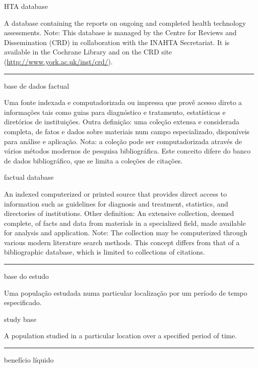 \documentclass[
]{book}
\begin{document}
HTA database

A database containing the reports on ongoing and completed health technology assessments. Note: This database is managed by the Centre for Reviews and Dissemination (CRD) in collaboration with the INAHTA Secretariat. It is available in the Cochrane Library and on the CRD site (\url{http://www.york.ac.uk/inst/crd/}).

\begin{center}\rule{0.5\linewidth}{0.5pt}\end{center}

base de dados factual

Uma fonte indexada e computadorizada ou impressa que provê acesso direto a informações tais como guias para diagnóstico e tratamento, estatísticas e diretórios de instituições. Outra definição: uma coleção extensa e considerada completa, de fatos e dados sobre materiais num campo especializado, disponíveis para análise e aplicação. Nota: a coleção pode ser computadorizada através de vários métodos modernos de pesquisa bibliográfica. Este conceito difere do banco de dados bibliográfico, que se limita a coleções de citações.

factual database

An indexed computerized or printed source that provides direct access to information such as guidelines for diagnosis and treatment, statistics, and directories of institutions. Other definition: An extensive collection, deemed complete, of facts and data from materials in a specialized field, made available for analysis and application. Note: The collection may be computerized through various modern literature search methods. This concept differs from that of a bibliographic database, which is limited to collections of citations.

\begin{center}\rule{0.5\linewidth}{0.5pt}\end{center}

base do estudo

Uma população estudada numa particular localização por um período de tempo especificado.

study base

A population studied in a particular location over a specified period of time.

\begin{center}\rule{0.5\linewidth}{0.5pt}\end{center}

benefício líquido
\end{document}
